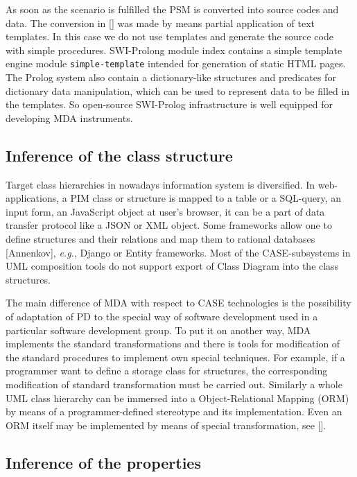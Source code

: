 \documentclass[conference,a4paper]{IEEEtran}
\begin{document}
As soon as the scenario is fulfilled the PSM is converted into source codes and data.  The conversion in [] was made by means partial application of text templates.  In this case we do not use templates and generate the source code with simple procedures.  SWI-Prolong module index contains a simple template engine module \texttt{simple-template} intended for generation of static HTML pages.  The Prolog system also contain a dictionary-like structures and predicates for dictionary data manipulation, which can be used to represent data to be filled in the templates.  So open-source SWI-Prolog infrastructure is well equipped for developing MDA instruments.

\subsection{Inference of the class structure}
\label{sec:infstru}

Target class hierarchies in nowadays information system is diversified.  In web-applications, a PIM class or structure is mapped to a table or a SQL-query, an input form, an JavaScript object at user's browser, it can be a part of data transfer protocol like a JSON or XML object.  Some frameworks allow one to define structures and their relations and map them to rational databases [Annenkov], \emph{e.g.}, Django or Entity frameworks.  Most of the CASE-subsystems in UML composition tools do not support export of Class Diagram into the class structures.

The main difference of MDA with respect to CASE technologies is the possibility of adaptation of PD to the special way of software development used in a particular software development group.  To put it on another way, MDA implements the standard transformations and there is tools for modification of the standard procedures to implement own special techniques.  For example, if a programmer want to define a storage class for structures, the corresponding modification of standard transformation must be carried out.  Similarly a whole UML class hierarchy can be immersed into a Object-Relational Mapping (ORM) by means of a programmer-defined stereotype and its implementation.  Even an ORM itself may be implemented by means of special transformation, see [].


\subsection{Inference of the properties}
\label{sec:infprop}
\end{document}
